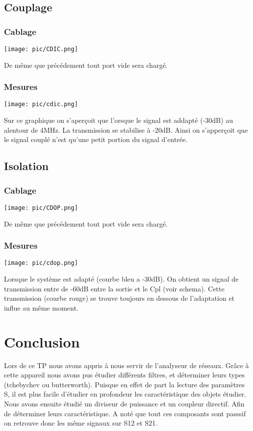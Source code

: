 \documentclass[a4paper,12pt]{report}            %
\begin{document}
\section{Couplage}
\subsection{Cablage}
\begin{center}\texttt{[image: pic/CDIC.png]}\\ \end{center}
De même que précédement tout port vide sera chargé.
\newpage 
\subsection{Mesures}
\begin{center}\texttt{[image: pic/cdic.png]}\\\end{center}
Sur ce graphique on s'aperçoit que l'orsque le signal est addapté (-30dB) au alentour de 4MHz.
La transmission se stabilise à -20dB. Ainsi on s'apperçoit que le signal couplé n'est qu'une petit
portion du signal d'entrée.
\section{Isolation}
\subsection{Cablage}
\begin{center}\texttt{[image: pic/CDOP.png]}\\ \end{center}
De même que précédement tout port vide sera chargé.
\newpage
\subsection{Mesures}
\begin{center}\texttt{[image: pic/cdop.png]} \\\end{center}
Lorsque le système est adapté (courbe bleu a -30dB). On obtient un signal de transmission entre 
de -60dB entre la sortie et le Cpl (voir schema). Cette transmission (courbe rouge) se trouve 
toujours en dessous de l'adaptation et influe au même moment. 
\chapter{Conclusion}
Lors de ce TP nous avons appris à nous servir de l'analyseur de réseaux. Grâce à cette appareil
nous avons pus étudier différents filtres, et déterminer leurs types (tchebychev ou butterworth). 
Puisque en effet de part la lecture des paramètres S, il est plus facile d'étudier en profondeur les 
caractéristique des objets étudier.
Nous avons ensuite étudié un diviseur de puissance et un coupleur directif. Afin de déterminer leurs
caractéristique.
A noté que tout ces composants sont passsif on retrouve donc les même signaux sur S12 et S21.
\end{document}
